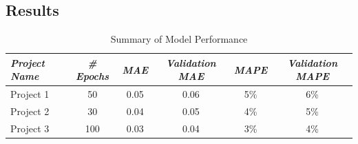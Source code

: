 \subsection{Results}
\begin{table}[ht]
    \centering
    \caption{Summary of Model Performance}
    \label{pseudo_cylindrical_results_table}
    \renewcommand{\arraystretch}{1.2} %
    \begin{tabular}{|l|c|c|c|c|c|}
        \hline
        \rowcolor[gray]{0.9}
        \textbf{\emph{Project Name}} & \textbf{\emph{\# Epochs}} & \textbf{\emph{MAE}} & \textbf{\emph{Validation MAE}} & \textbf{\emph{MAPE}} & \textbf{\emph{Validation MAPE}} \\ \hline
        Project 1                    & 50                        & 0.05                & 0.06                           & 5\%                  & 6\%                             \\ \hline
        Project 2                    & 30                        & 0.04                & 0.05                           & 4\%                  & 5\%                             \\ \hline
        Project 3                    & 100                       & 0.03                & 0.04                           & 3\%                  & 4\%                             \\ \hline
    \end{tabular}
\end{table}
